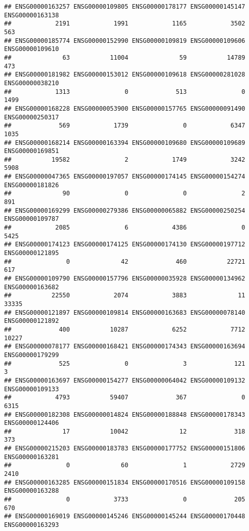 \documentclass[
]{article}
\begin{document}
\begin{verbatim}
## ENSG00000163257 ENSG00000109805 ENSG00000178177 ENSG00000145147 ENSG00000163138 
##            2191            1991            1165            3502             563 
## ENSG00000185774 ENSG00000152990 ENSG00000109819 ENSG00000109606 ENSG00000109610 
##              63           11004              59           14789             473 
## ENSG00000181982 ENSG00000153012 ENSG00000109618 ENSG00000281028 ENSG00000038210 
##            1313               0             513               0            1499 
## ENSG00000168228 ENSG00000053900 ENSG00000157765 ENSG00000091490 ENSG00000250317 
##             569            1739               0            6347            1035 
## ENSG00000168214 ENSG00000163394 ENSG00000109680 ENSG00000109689 ENSG00000169851 
##           19582               2            1749            3242            5908 
## ENSG00000047365 ENSG00000197057 ENSG00000174145 ENSG00000154274 ENSG00000181826 
##              90               0               0               2             891 
## ENSG00000169299 ENSG00000279386 ENSG00000065882 ENSG00000250254 ENSG00000109787 
##            2085               6            4386               0            5425 
## ENSG00000174123 ENSG00000174125 ENSG00000174130 ENSG00000197712 ENSG00000121895 
##               0              42             460           22721             617 
## ENSG00000109790 ENSG00000157796 ENSG00000035928 ENSG00000134962 ENSG00000163682 
##           22550            2074            3883              11           33335 
## ENSG00000121897 ENSG00000109814 ENSG00000163683 ENSG00000078140 ENSG00000121892 
##             400           10287            6252            7712           10227 
## ENSG00000078177 ENSG00000168421 ENSG00000174343 ENSG00000163694 ENSG00000179299 
##             525               0               3             121               3 
## ENSG00000163697 ENSG00000154277 ENSG00000064042 ENSG00000109132 ENSG00000109133 
##            4793           59407             367               0            6315 
## ENSG00000182308 ENSG00000014824 ENSG00000188848 ENSG00000178343 ENSG00000124406 
##              17           10042              12             318             373 
## ENSG00000215203 ENSG00000183783 ENSG00000177752 ENSG00000151806 ENSG00000163281 
##               0              60               1            2729            2410 
## ENSG00000163285 ENSG00000151834 ENSG00000170516 ENSG00000109158 ENSG00000163288 
##               0            3733               0             205             670 
## ENSG00000169019 ENSG00000145246 ENSG00000145244 ENSG00000170448 ENSG00000163293 

\end{verbatim}
\end{document}
